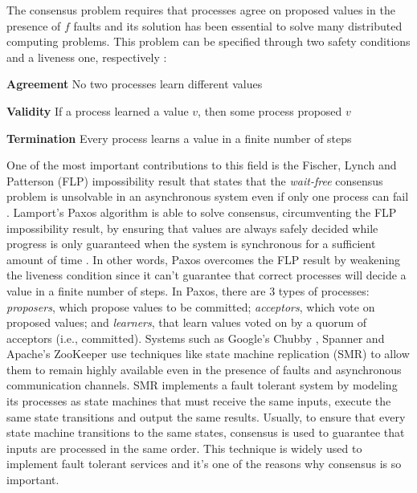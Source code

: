 The consensus problem requires that processes agree on proposed values in the presence of $f$ faults and its solution has been essential to solve many distributed computing problems. This problem can be specified through two safety conditions and a liveness one, respectively \cite{vukolic2012quorum}: \par
\textbf{Agreement} No two processes learn different values\par 
\textbf{Validity} If a process learned a value $v$, then some process proposed $v$\par
\textbf{Termination} Every process learns a value in a finite number of steps\par
One of the most important contributions to this field is the Fischer, Lynch and Patterson (FLP) impossibility result that states that the \textit{wait-free} consensus problem is unsolvable in an asynchronous system even if only one process can fail \cite{Fischer1985}. Lamport's Paxos algorithm is able to solve consensus, circumventing the FLP impossibility result, by ensuring that values are always safely decided while progress is only guaranteed when the system is synchronous for a sufficient amount of time \cite{Lamport2001}. In other words, Paxos overcomes the FLP result by weakening the liveness condition since it can't guarantee that correct processes will decide a value in a finite number of steps. In Paxos, there are 3 types of processes: \textit{proposers}, which propose values to be committed; \textit{acceptors}, which vote on proposed values; and \textit{learners}, that learn values voted on by a quorum of acceptors (i.e., committed). Systems such as Google's Chubby \cite{Burrows2006}, Spanner \cite{Corbett2012} and Apache's ZooKeeper \cite{Junqueira2011} use techniques like state machine replication (SMR) to allow them to remain highly available even in the presence of faults and asynchronous communication channels. SMR implements a fault tolerant system by modeling its processes as state machines that must receive the same inputs, execute the same state transitions and output the same results. Usually, to ensure that every state machine transitions to the same states, consensus is used to guarantee that inputs are processed in the same order. This technique is widely used to implement fault tolerant services and it's one of the reasons why consensus is so important.\par
